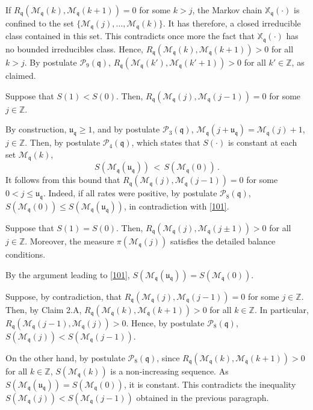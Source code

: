 \documentclass[reqno]{amsart}
\theoremstyle{plain}
\theoremstyle{definition}
\newcommand{\mc}[1]{{\mathcal #1}}
\newcommand{\mf}[1]{{\mathfrak #1}}
\newcommand{\bb}[1]{{\mathbb #1}}
\newcommand{\ms}[1]{{\mathscr #1}}
\newcounter{as}[section]
\newcommand{\<}{\langle}
\renewcommand{\>}{\rangle}
\begin{document}
If $R_{\mf q} (\ms M_{\mf q} (k), \ms M_{\mf q} (k+1)) = 0$ for some
$k>j$, the Markov chain $\bb X_{\mf q}(\cdot)$ is confined to the set
$\{\ms M_{\mf q} (j), \dots, \ms M_{\mf q} (k)\}$. It has therefore, a
closed irreducible class contained in this set. This contradicts once
more the fact that $\bb X_{\mf q}(\cdot)$ has no bounded irreducibles
class.  Hence,
$R_{\mf q} (\ms M_{\mf q} (k), \ms M_{\mf q} (k+1)) > 0$ for all
$k>j$. By postulate $\mc P_9(\mf q)$,
$R_{\mf q} (\ms M_{\mf q} (k'), \ms M_{\mf q} (k'+1))> 0$ for all
$k'\in\bb Z$, as claimed. \smallskip

\smallskip
{} Suppose that $S(1)< S(0)$. Then,
$R_{\mf q} (\ms M_{\mf q} (j), \ms M_{\mf q} (j-1))= 0$ for some
$j\in \bb Z$.

By construction, $\mf u_{\mf q} \ge 1$, and by postulate
$\mc P_3(\mf q)$,
$\ms M_{\mf q} (j + \mf u_{\mf q}) = \ms M_{\mf q} (j) +1$, $j\in \bb Z$.
Then, by postulate $\mc P_4(\mf q)$, which states that $S(\cdot)$ is
constant at each set $\ms M_{\mf q} (k)$,
\begin{equation}
\label{101}
S(\ms M_{\mf q} (\mf u_{\mf q})) \,<\, S(\ms M_{\mf q} (0))\,.
\end{equation}
It follows from this bound that $R_{\mf q} (\ms M_{\mf q} (j),  \ms
M_{\mf q} (j-1))= 0$ for some $0< j \le \mf u_{\mf q}$. Indeed, if all
rates were positive, by postulate $\mc P_8(\mf q)$, $S(\ms M_{\mf q}
(0)) \le S(\ms M_{\mf q} (\mf u_{\mf q}))$, in contradiction with
\eqref{101}. 

\smallskip
{} Suppose that $S(1)= S(0)$. Then,
$R_{\mf q} (\ms M_{\mf q} (j), \ms M_{\mf q} (j\pm 1))> 0$ for all
$j\in \bb Z$. Moreover, the measure $\pi(\ms M_{\mf q} (j))$ satisfies
the detailed balance conditions.

By the argument leading to \eqref{101},
$S(\ms M_{\mf q} (\mf u_{\mf q})) = S(\ms M_{\mf q} (0))$.

Suppose, by contradiction, that
$R_{\mf q} (\ms M_{\mf q} (j), \ms M_{\mf q} (j- 1)) = 0$ for some
$j\in \bb Z$. Then, by Claim 2.A,
$R_{\mf q} (\ms M_{\mf q} (k), \ms M_{\mf q} (k+ 1)) > 0$ for all
$k\in \bb Z$. In particular,
$R_{\mf q} (\ms M_{\mf q} (j-1), \ms M_{\mf q} (j)) > 0$. Hence, by
postulate $\mc P_8(\mf q)$,
$S(\ms M_{\mf q} (j)) < S(\ms M_{\mf q} (j-1))$.

On the other hand, by postulate $\mc P_8(\mf q)$, since
$R_{\mf q} (\ms M_{\mf q} (k), \ms M_{\mf q} (k+ 1)) > 0$ for all
$k\in \bb Z$,
$S(\ms M_{\mf q} (k))$ is a non-increasing sequence. As
$S(\ms M_{\mf q} (\mf u_{\mf q})) = S(\ms M_{\mf q} (0))$, it is
constant. This contradicts the inequality $S(\ms M_{\mf q} (j)) <
S(\ms M_{\mf q} (j-1))$ obtained in the previous paragraph.
\end{document}
